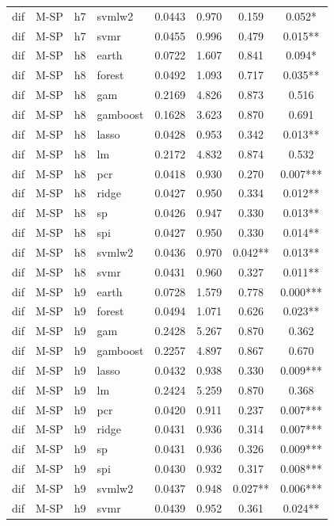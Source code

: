 \begin{ThreePartTable}
\begin{longtable}[t]{llclcccc}
dif & M-SP & h7 & svmlw2 & 0.0443 & 0.970 & 0.159 & 0.052*\\
dif & M-SP & h7 & svmr & 0.0455 & 0.996 & 0.479 & 0.015**\\
\addlinespace
dif & M-SP & h8 & earth & 0.0722 & 1.607 & 0.841 & 0.094*\\
dif & M-SP & h8 & forest & 0.0492 & 1.093 & 0.717 & 0.035**\\
dif & M-SP & h8 & gam & 0.2169 & 4.826 & 0.873 & 0.516\\
dif & M-SP & h8 & gamboost & 0.1628 & 3.623 & 0.870 & 0.691\\
dif & M-SP & h8 & lasso & 0.0428 & 0.953 & 0.342 & 0.013**\\
dif & M-SP & h8 & lm & 0.2172 & 4.832 & 0.874 & 0.532\\
dif & M-SP & h8 & pcr & 0.0418 & 0.930 & 0.270 & 0.007***\\
dif & M-SP & h8 & ridge & 0.0427 & 0.950 & 0.334 & 0.012**\\
dif & M-SP & h8 & sp & 0.0426 & 0.947 & 0.330 & 0.013**\\
dif & M-SP & h8 & spi & 0.0427 & 0.950 & 0.330 & 0.014**\\
dif & M-SP & h8 & svmlw2 & 0.0436 & 0.970 & 0.042** & 0.013**\\
dif & M-SP & h8 & svmr & 0.0431 & 0.960 & 0.327 & 0.011**\\
\addlinespace
dif & M-SP & h9 & earth & 0.0728 & 1.579 & 0.778 & 0.000***\\
dif & M-SP & h9 & forest & 0.0494 & 1.071 & 0.626 & 0.023**\\
dif & M-SP & h9 & gam & 0.2428 & 5.267 & 0.870 & 0.362\\
dif & M-SP & h9 & gamboost & 0.2257 & 4.897 & 0.867 & 0.670\\
dif & M-SP & h9 & lasso & 0.0432 & 0.938 & 0.330 & 0.009***\\
dif & M-SP & h9 & lm & 0.2424 & 5.259 & 0.870 & 0.368\\
dif & M-SP & h9 & pcr & 0.0420 & 0.911 & 0.237 & 0.007***\\
dif & M-SP & h9 & ridge & 0.0431 & 0.936 & 0.314 & 0.007***\\
dif & M-SP & h9 & sp & 0.0431 & 0.936 & 0.326 & 0.009***\\
dif & M-SP & h9 & spi & 0.0430 & 0.932 & 0.317 & 0.008***\\
dif & M-SP & h9 & svmlw2 & 0.0437 & 0.948 & 0.027** & 0.006***\\
dif & M-SP & h9 & svmr & 0.0439 & 0.952 & 0.361 & 0.024**\\

\end{longtable}
\end{ThreePartTable}
